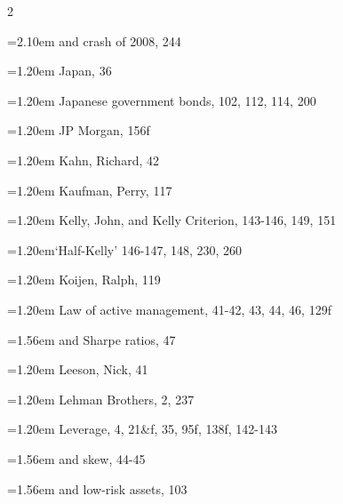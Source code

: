 {\begin{multicols}{2}
\par \noindent\hangindent=2.10em\hspace*{0.90em} and crash of 2008, 244
\par \noindent\hangindent=1.20em\hspace*{0.00em} Japan, 36
\par \noindent\hangindent=1.20em\hspace*{0.00em} Japanese government bonds, 102, 112, 114, 200
\par \noindent\hangindent=1.20em\hspace*{0.00em} JP Morgan, 156f
\par \noindent\hangindent=1.20em\hspace*{0.00em} Kahn, Richard, 42
\par \noindent\hangindent=1.20em\hspace*{0.00em} Kaufman, Perry, 117
\par \noindent\hangindent=1.20em\hspace*{0.00em} Kelly, John, and Kelly Criterion, 143-146, 149, 151
\par \noindent\hangindent=1.20em\hspace*{0.00em}‘Half-Kelly’ 146-147, 148, 230, 260
\par \noindent\hangindent=1.20em\hspace*{0.00em} Koijen, Ralph, 119
\par \noindent\hangindent=1.20em\hspace*{0.00em} Law of active management, 41-42, 43, 44, 46, 129f
\par \noindent\hangindent=1.56em\hspace*{0.36em} and Sharpe ratios, 47
\par \noindent\hangindent=1.20em\hspace*{0.00em} Leeson, Nick, 41
\par \noindent\hangindent=1.20em\hspace*{0.00em} Lehman Brothers, 2, 237
\par \noindent\hangindent=1.20em\hspace*{0.00em} Leverage, 4, 21\&f, 35, 95f, 138f, 142-143
\par \noindent\hangindent=1.56em\hspace*{0.36em} and skew, 44-45
\par \noindent\hangindent=1.56em\hspace*{0.36em} and low-risk assets, 103

\end{multicols}}
